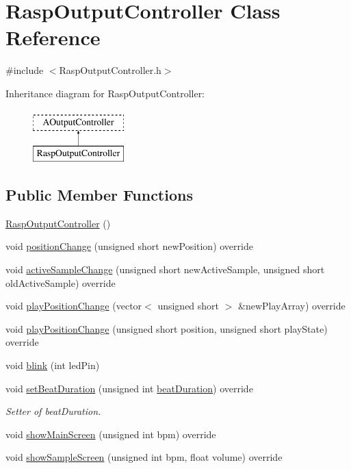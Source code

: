 \hypertarget{class_rasp_output_controller}{}\section{Rasp\+Output\+Controller Class Reference}
\label{class_rasp_output_controller}


{\ttfamily \#include $<$Rasp\+Output\+Controller.\+h$>$}

Inheritance diagram for Rasp\+Output\+Controller\+:\begin{figure}[H]
\begin{center}
\leavevmode
\includegraphics[height=2.000000cm]{class_rasp_output_controller}
\end{center}
\end{figure}
\subsection*{Public Member Functions}
\begin{DoxyCompactItemize}
\item 
\hyperlink{class_rasp_output_controller_afd7487de7ff81c6b092f4072d4fa80a5}{Rasp\+Output\+Controller} ()
\item 
void \hyperlink{class_rasp_output_controller_afce87d510c0564567e4250b22639d5e0}{position\+Change} (unsigned short new\+Position) override
\item 
void \hyperlink{class_rasp_output_controller_a92954cf26d4dd5f7d8835d1d508302c0}{active\+Sample\+Change} (unsigned short new\+Active\+Sample, unsigned short old\+Active\+Sample) override
\item 
void \hyperlink{class_rasp_output_controller_af0304196681872f9c1f6d6f2e2db14a6}{play\+Position\+Change} (vector$<$ unsigned short $>$ \&new\+Play\+Array) override
\item 
void \hyperlink{class_rasp_output_controller_a0778395ee8ec044d04fbfcb2f3b2eb04}{play\+Position\+Change} (unsigned short position, unsigned short play\+State) override
\item 
void \hyperlink{class_rasp_output_controller_a23987d33142c3c09abf8126773f32d99}{blink} (int led\+Pin)
\item 
void \hyperlink{class_rasp_output_controller_a5fd551f1aba056356befd71e5bff23f1}{set\+Beat\+Duration} (unsigned int \hyperlink{class_rasp_output_controller_a8c6d21d4749ca4e767dcff93f2c6d7ac}{beat\+Duration}) override
\begin{DoxyCompactList}\small\item\em Setter of beat\+Duration. \end{DoxyCompactList}\item 
void \hyperlink{class_rasp_output_controller_ad195a3d664b7c7e5680cd8949203c1fc}{show\+Main\+Screen} (unsigned int bpm) override
\item 
void \hyperlink{class_rasp_output_controller_a613d3a1d1ceb31875be95e4a4b733fba}{show\+Sample\+Screen} (unsigned int bpm, float volume) override
\end{DoxyCompactItemize}
